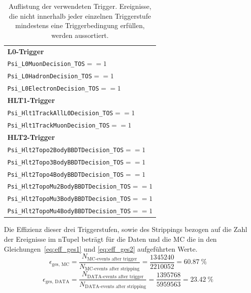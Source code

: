 \begin{table}[htb]
  \centering
  \caption{Auflistung der verwendeten Trigger.
  Ereignisse, die nicht innerhalb jeder einzelnen Triggerstufe mindestens eine Triggerbedingung erfüllen, werden aussortiert.}
  \begin{tabular}{l}
    \toprule
    \textbf{L0-Trigger}                                           \\
    \quad\texttt{Psi\_L0MuonDecision\_TOS}\quad$==1$              \\
    \quad\texttt{Psi\_L0HadronDecision\_TOS}\quad$==1$            \\
    \quad\texttt{Psi\_L0ElectronDecision\_TOS}\quad$==1$          \\
    \midrule
    \textbf{HLT1-Trigger}                                         \\
    \quad\texttt{Psi\_Hlt1TrackAllL0Decision\_TOS}\quad$==1$      \\
    \quad\texttt{Psi\_Hlt1TrackMuonDecision\_TOS}\quad$==1$       \\
    \midrule
    \textbf{HLT2-Trigger}                                         \\
    \quad\texttt{Psi\_Hlt2Topo2BodyBBDTDecision\_TOS}\quad$==1$   \\
    \quad\texttt{Psi\_Hlt2Topo3BodyBBDTDecision\_TOS}\quad$==1$   \\
    \quad\texttt{Psi\_Hlt2Topo4BodyBBDTDecision\_TOS}\quad$==1$   \\
    \quad\texttt{Psi\_Hlt2TopoMu2BodyBBDTDecision\_TOS}\quad$==1$ \\
    \quad\texttt{Psi\_Hlt2TopoMu3BodyBBDTDecision\_TOS}\quad$==1$ \\
    \quad\texttt{Psi\_Hlt2TopoMu4BodyBBDTDecision\_TOS}\quad$==1$ \\
    \bottomrule
  \end{tabular}
  \label{tab:trigger}
\end{table}
%
Die Effizienz dieser drei Triggerstufen, sowie des Strippings bezogen auf die Zahl der Ereignisse im nTupel beträgt für die Daten und die MC die in den Gleichungen~\ref{eq:eff_ges1} und \ref{eq:eff_ges2} aufgeführten Werte.
%
\begin{equation}
  \epsilon_\text{ges, MC}=\frac{N_\text{MC-events after trigger}}{N_\text{MC-events after stripping}}=\frac{1345240}{2210052}=\SI{60.87}{\percent}
  \label{eq:eff_ges1}
\end{equation}
\begin{equation}
  \epsilon_\text{ges, DATA}=\frac{N_\text{DATA-events after trigger}}{N_\text{DATA-events after stripping}}=\frac{1395768}{5959563}=\SI{23.42}{\percent}
  \label{eq:eff_ges2}
\end{equation}
%
